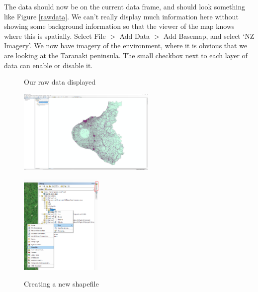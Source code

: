 \documentclass{article}
\begin{document}
The data should now be on the current data frame, and should look something like Figure \ref{rawdata}. We can't really display much information here without showing some background information so that the viewer of the map knows where this is spatially. Select File $>$ Add Data $>$ Add Basemap, and select `NZ Imagery'. We now have imagery of the environment, where it is obvious that we are looking at the Taranaki peninsula. The small checkbox next to each layer of data can enable or disable it.\\

\begin{figure}[h]
  \centering
  \begin{minipage}[b]{0.4\textwidth}
    \centering
    \caption{Our raw data displayed}
    \includegraphics[width=250px]{images/part1/rawdata.PNG}
    \label{rawdata}
  \end{minipage}
  \hfill
  \begin{minipage}[b]{0.4\textwidth}
    \centering
    \caption{Creating a new shapefile}
    \includegraphics[width=150px]{images/part1/newshp_catalog.PNG}
    \label{newshp_catalog}
  \end{minipage}
\end{figure}
\end{document}
